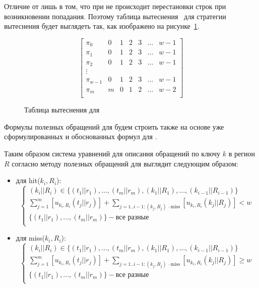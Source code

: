 \begin{enumerate}
Отличие от \LRU лишь в том, что при \FIFO не происходит перестановки
строк при возникновении попадания. Поэтому таблица
вытеснения~\cite{policy_tables} для стратегии вытеснения \FIFO будет
выглядеть так, как изображено на рисунке~\ref{fifo_policy_table}.

\begin{figure}[h]
$$
  \left[
    \begin{array}{c|cccccc}
      \pi_0 & 0 & 1 & 2 & 3 & \dots & w{-}1 \\
      \pi_1 & 0 & 1 & 2 & 3 & \dots & w{-}1 \\
      \pi_2 & 0 & 1 & 2 & 3 & \dots & w{-}1 \\
      \vdots &  &  &  & & & \\
      \pi_{w-1} & 0 & 1 & 2 & 3 & \dots & w{-}1 \\
      \pi_m & m & 0 & 1 & 2 & \dots & w{-}2 \\
    \end{array}
  \right]
$$
\caption{Таблица вытеснения для \FIFO}\label{fifo_policy_table}
\end{figure}

Формулы полезных обращений для \FIFO будем строить также на основе уже сформулированных и обоснованных формул для \LRU.


Таким образом система уравнений для описания обращений по ключу $k$ в регион $R$
согласно методу полезных обращений для \FIFO выглядит следующим образом:
\begin{itemize}
\item для hit($k_i, R_i$):
$$
\left\{\begin{array}{l} (k_i||R_i) \in \{(t_1||r_1), ..., (t_m||r_m), (k_1||R_1), ..., (k_{i-1}||R_{i-1})\}\\
\sum\limits_{j=1}^m [u_{k_i,R_i}(t_j||r_j)] + \sum\limits_{j=1..{i-1}:(k_j,R_j)\mbox{~--miss}} [u_{k_i,R_i}(k_j||R_j)] < w\\
\{(t_1||r_1), ..., (t_m||r_m)\} - \mbox{все разные}\\
\end{array} \right.
$$
\item для miss($k_i, R_i$):
$$
\left\{\begin{array}{l} (k_i||R_i) \in \{(t_1||r_1), ..., (t_m||r_m), (k_1||R_1), ..., (k_{i-1}||R_{i-1})\}\\
\sum\limits_{j=1}^m [u_{k_i,R_i}(t_j||r_j)] + \sum\limits_{j=1..{i-1}:(k_j,R_j)\mbox{~--miss}} [u_{k_i,R_i}(k_j||R_j)] \geqslant w\\
\{(t_1||r_1), ..., (t_m||r_m)\} - \mbox{все разные}\\
\end{array} \right.
$$
\end{itemize}


\end{enumerate}
